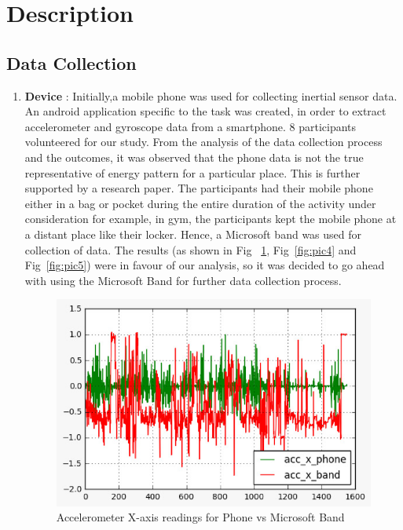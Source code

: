 \documentclass{acm_proc_article-sp}
\begin{document}
\section{Description}
\subsection{Data Collection}

\begin{enumerate}
\item \textbf{Device} :
Initially,a mobile phone was used for collecting inertial sensor data. An android application specific to the task was created, in order to extract accelerometer and gyroscope data from a smartphone. 8 participants volunteered for our study. From the analysis of the data collection process and the outcomes, it was observed that the phone data is not the true representative of energy pattern for a particular place. This is further supported by a research paper\cite{Dey:2011:GCE:2030112.2030135}.
The participants had their mobile phone either in a bag or pocket during the entire duration of the activity under consideration for example, in gym, the participants kept the mobile phone at a distant place like their locker. Hence, a Microsoft band was used for collection of data. The results (as shown in Fig ~\ref{fig:pic6}, Fig~\ref{fig:pic4} and Fig~\ref{fig:pic5}) were in favour of our analysis, so it was decided to go ahead with using the Microsoft Band for further data collection process.

\begin{figure}[h]
\includegraphics[scale=0.75]{Picture6.png}
\caption{Accelerometer X-axis readings for Phone vs Microsoft Band}
\label{fig:pic6}
\end{figure}


\end{enumerate}
\end{document}
